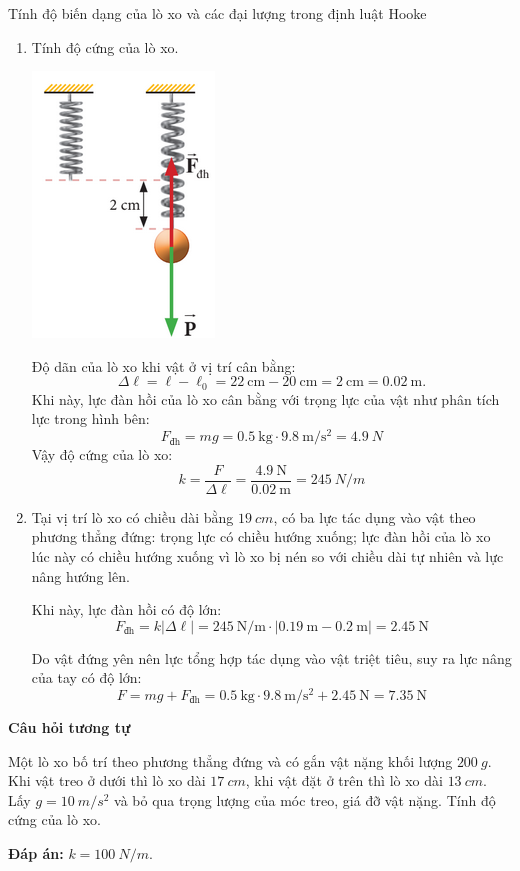 \begin{dang}{Tính độ biến dạng của lò xo và các đại lượng trong định luật Hooke}
{		\begin{enumerate}[label=\alph*)]
			\item Tính độ cứng của lò xo.
			\begin{center}
				\includegraphics[scale=0.6]{../figs/G10-028-4}
			\end{center}
			
			Độ dãn của lò xo khi vật ở vị trí cân bằng:
			$$\Delta \ell = \ell - \ell_0 = \SI{22}{\centi\meter} - \SI{20}{\centi\meter} = \SI{2}{\centi\meter}=\SI{0.02}{\meter}.$$
			Khi này, lực đàn hồi của lò xo cân bằng với trọng lực của vật như phân tích lực trong hình bên:
			$$F_\text{đh} = m g = \SI{0.5}{\kilogram} \cdot \SI{9.8}{\meter/\second^2} = \SI{4.9}{N}$$
			Vậy độ cứng của lò xo:
			$$k=\dfrac{F}{\Delta \ell} = \dfrac{\SI{4.9}{\newton}}{\SI{0.02}{\meter}} = \SI{245}{N/m}$$
			
			\item Tại vị trí lò xo có chiều dài bằng $\SI{19}{cm}$, có ba lực tác dụng vào vật theo phương thẳng đứng: trọng lực có chiều hướng xuống; lực đàn hồi của lò xo lúc này có chiều hướng xuống vì lò xo bị nén so với chiều dài tự nhiên và lực nâng hướng lên.
			
			Khi này, lực đàn hồi có độ lớn:
			$$F_\text{đh} = k |\Delta \ell| = \SI{245}{\newton/\meter} \cdot |\SI{0.19}{\meter} - \SI{0.2}{\meter}| = \SI{2.45}{\newton}$$
			
			Do vật đứng yên nên lực tổng hợp tác dụng vào vật triệt tiêu, suy ra lực nâng của tay có độ lớn:
			$$F=m  g + F_\text{đh} =\SI{0.5}{\kilogram}\cdot\SI{9.8}{\meter/\second^2} + \SI{2.45}{\newton} = \SI{7.35}{\newton}$$
		\end{enumerate}
		
		\begin{center}
			\textbf{Câu hỏi tương tự}
		\end{center}
		
		Một lò xo bố trí theo phương thẳng đứng và có gắn vật nặng khối lượng $\SI{200}{g}$. Khi vật treo ở dưới thì lò xo dài $\SI{17}{cm}$, khi vật đặt ở trên thì lò xo dài $\SI{13}{cm}$. Lấy $g=\SI{10}{m/s^2}$ và bỏ qua trọng lượng của móc treo, giá đỡ vật nặng. Tính độ cứng của lò xo.
		
		\textbf{Đáp án:} $k=\SI{100}{N/m}$.
	}
\end{dang}